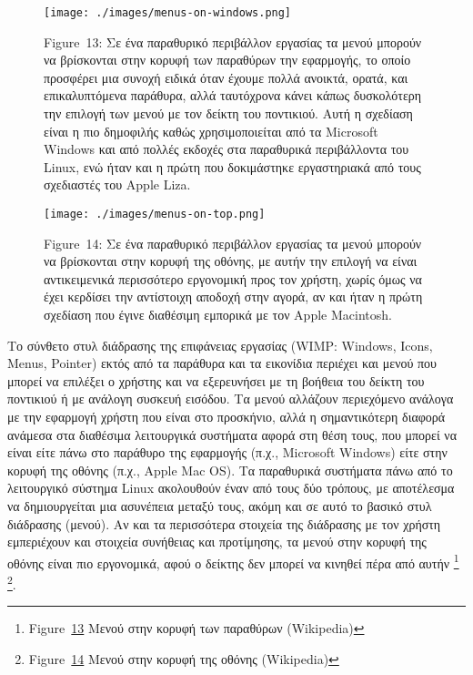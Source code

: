 \documentclass[
]{article}
\begin{document}
\leavevmode{}%
\begin{figure}
\hypertarget{fig:menus-on-windows}{%
\centering
\texttt{[image: ./images/menus-on-windows.png]}
\caption{Figure~13: Σε ένα παραθυρικό περιβάλλον εργασίας τα μενού
μπορούν να βρίσκονται στην κορυφή των παραθύρων την εφαρμογής, το οποίο
προσφέρει μια συνοχή ειδικά όταν έχουμε πολλά ανοικτά, ορατά, και
επικαλυπτόμενα παράθυρα, αλλά ταυτόχρονα κάνει κάπως δυσκολότερη την
επιλογή των μενού με τον δείκτη του ποντικιού. Αυτή η σχεδίαση είναι η
πιο δημοφιλής καθώς χρησιμοποιείται από τα Microsoft Windows και από
πολλές εκδοχές στα παραθυρικά περιβάλλοντα του Linux, ενώ ήταν και η
πρώτη που δοκιμάστηκε εργαστηριακά από τους σχεδιαστές του Apple
Liza.}\label{fig:menus-on-windows}
}
\end{figure}

\leavevmode{}%
\begin{figure}
\hypertarget{fig:menus-on-top}{%
\centering
\texttt{[image: ./images/menus-on-top.png]}
\caption{Figure~14: Σε ένα παραθυρικό περιβάλλον εργασίας τα μενού
μπορούν να βρίσκονται στην κορυφή της οθόνης, με αυτήν την επιλογή να
είναι αντικειμενικά περισσότερο εργονομική προς τον χρήστη, χωρίς όμως
να έχει κερδίσει την αντίστοιχη αποδοχή στην αγορά, αν και ήταν η πρώτη
σχεδίαση που έγινε διαθέσιμη εμπορικά με τον Apple
Macintosh.}\label{fig:menus-on-top}
}
\end{figure}

Το σύνθετο στυλ διάδρασης της επιφάνειας εργασίας (WIMP: Windows, Icons,
Menus, Pointer) εκτός από τα παράθυρα και τα εικονίδια περιέχει και
μενού που μπορεί να επιλέξει ο χρήστης και να εξερευνήσει με τη βοήθεια
του δείκτη του ποντικιού ή με ανάλογη συσκευή εισόδου. Τα μενού αλλάζουν
περιεχόμενο ανάλογα με την εφαρμογή χρήστη που είναι στο προσκήνιο, αλλά
η σημαντικότερη διαφορά ανάμεσα στα διαθέσιμα λειτουργικά συστήματα
αφορά στη θέση τους, που μπορεί να είναι είτε πάνω στο παράθυρο της
εφαρμογής (π.χ., Microsoft Windows) είτε στην κορυφή της οθόνης (π.χ.,
Apple Mac OS). Τα παραθυρικά συστήματα πάνω από το λειτουργικό σύστημα
Linux ακολουθούν έναν από τους δύο τρόπους, με αποτέλεσμα να
δημιουργείται μια ασυνέπεια μεταξύ τους, ακόμη και σε αυτό το βασικό
στυλ διάδρασης (μενού). Αν και τα περισσότερα στοιχεία της διάδρασης με
τον χρήστη εμπεριέχουν και στοιχεία συνήθειας και προτίμησης, τα μενού
στην κορυφή της οθόνης είναι πιο εργονομικά, αφού ο δείκτης δεν μπορεί
να κινηθεί πέρα από αυτήν \footnote{Figure~\protect\hyperlink{fig:menus-on-windows}{13}
  Μενού στην κορυφή των παραθύρων (Wikipedia)} \footnote{Figure~\protect\hyperlink{fig:menus-on-top}{14}
  Μενού στην κορυφή της οθόνης (Wikipedia)}.
\end{document}
